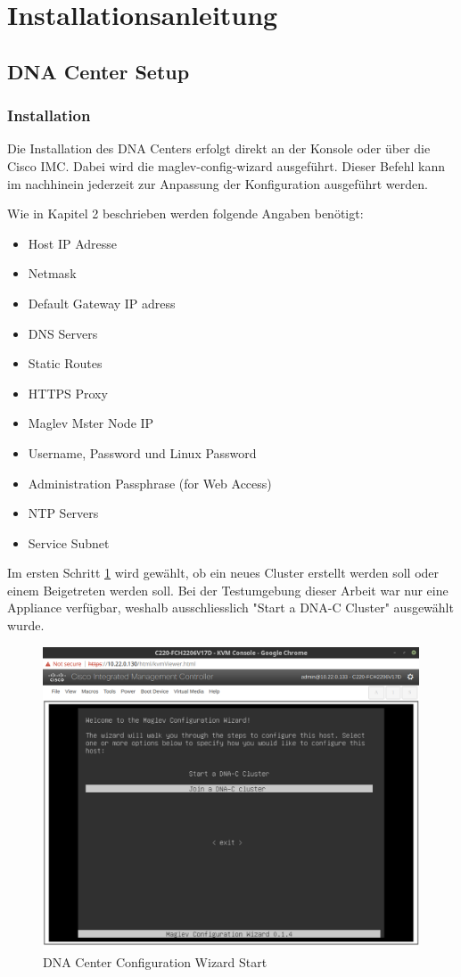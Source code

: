 \section{Installationsanleitung}

\subsection{DNA Center Setup}

\subsubsection{Installation}
Die Installation des DNA Centers erfolgt direkt an der Konsole oder über die Cisco IMC. Dabei wird die maglev-config-wizard ausgeführt. Dieser Befehl kann im nachhinein jederzeit zur Anpassung der Konfiguration ausgeführt werden. 

Wie in \cite{cisco-dna-installation-guide} Kapitel 2 beschrieben werden folgende Angaben benötigt:
\begin{itemize}
	\item Host IP Adresse
	\item Netmask
	\item Default Gateway IP adress
	\item DNS Servers
	\item Static Routes
	\item HTTPS Proxy
	\item Maglev Mster Node IP
	\item Username, Password und Linux Password
	\item Administration Passphrase (for Web Access)
	\item NTP Servers
	\item Service Subnet
\end{itemize}

Im ersten Schritt \ref{fig:dna-center-install-step-1} wird gewählt, ob ein neues Cluster erstellt werden soll oder einem Beigetreten werden soll. Bei der Testumgebung dieser Arbeit war nur eine Appliance verfügbar, weshalb ausschliesslich "Start a DNA-C Cluster" ausgewählt wurde. 

\begin{figure}[H]
	\centering
	\includegraphics[height=9cm]{img/sc_001.png}
	\caption{DNA Center Configuration Wizard Start}
	\label{fig:dna-center-install-step-1}
\end{figure} 


